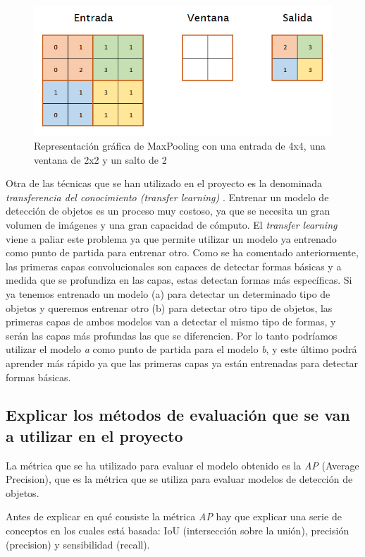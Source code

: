 \begin{figure}[H]
	\centering
	\includegraphics[width=0.7\linewidth]{images/maxpooling_example.png}
	\caption{Representación gráfica de MaxPooling con una entrada de 4x4, una ventana de 2x2 y un salto de 2}
	\label{fig:cnn_maxpooling}
\end{figure}

Otra de las técnicas que se han utilizado en el proyecto es la denominada \textit{transferencia del conocimiento (transfer learning)} \cite{s5_transfer_learning}. Entrenar un modelo de detección de objetos es un proceso muy costoso, ya que se necesita un gran volumen de imágenes y una gran capacidad de cómputo. El \textit{transfer learning} viene a paliar este problema ya que permite utilizar un modelo ya entrenado como punto de partida para entrenar otro. Como se ha comentado anteriormente, las primeras capas convolucionales son capaces de detectar formas básicas y a medida que se profundiza en las capas, estas detectan formas más específicas. Si ya tenemos entrenado un modelo (a) para detectar un determinado tipo de objetos y queremos entrenar otro (b) para detectar otro tipo de objetos, las primeras capas de ambos modelos van a detectar el mismo tipo de formas, y serán las capas más profundas las que se diferencien. Por lo tanto podríamos utilizar el modelo \textit{a} como punto de partida para el modelo \textit{b}, y este último podrá aprender más rápido ya que las primeras capas ya están entrenadas para detectar formas básicas.

\subsection{Explicar los métodos de evaluación que se van a utilizar en el proyecto}

La métrica que se ha utilizado para evaluar el modelo obtenido es la \textit{AP} (Average Precision), que es la métrica que se utiliza para evaluar modelos de detección de objetos.

Antes de explicar en qué consiste la métrica \textit{AP} hay que explicar una serie de conceptos en los cuales está basada: IoU (intersección sobre la unión), precisión (precision) y sensibilidad (recall).

